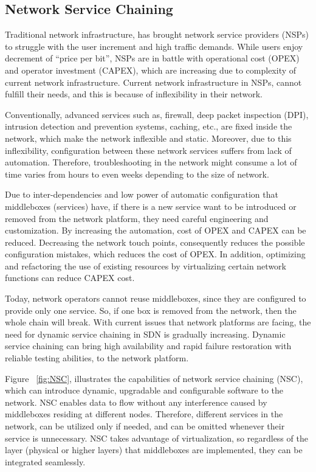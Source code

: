 \subsection{Network Service Chaining}

Traditional network infrastructure, has brought network service providers (NSPs) to struggle with the user increment and high traffic demands. While users enjoy decrement of “price per bit”, NSPs are in battle with operational cost (OPEX) and operator investment (CAPEX), which are increasing due to complexity of current network infrastructure. Current network infrastructure in NSPs, cannot fulfill their needs, and this is because of inflexibility in their network. \cite{Wol13}

Conventionally, advanced services such as, firewall, deep packet inspection (DPI), intrusion detection and prevention systems, caching, etc., are fixed inside the network, which make the network inflexible and static. Moreover, due to this inflexibility, configuration between these network services suffers from lack of automation. Therefore, troubleshooting in the network might consume a lot of time varies from hours to even weeks depending to the size of network. 

Due to inter-dependencies and low power of automatic configuration that middleboxes (services) have, if there is a new service want to be introduced or removed from the network platform, they need careful engineering and customization. By increasing the automation, cost of OPEX and CAPEX can be reduced.  Decreasing the network touch points, consequently reduces the possible configuration mistakes, which reduces the cost of OPEX. In addition, optimizing and refactoring the use of existing resources by virtualizing certain network functions can reduce CAPEX cost. 

Today, network operators cannot reuse middleboxes, since they are configured to provide only one service. So, if one box is removed from the network, then the whole chain will break. With current issues that network platforms are facing,  the need for dynamic service chaining in SDN is gradually increasing. Dynamic service chaining can bring high availability and rapid failure restoration with reliable testing abilities, to the network platform. 

Figure ~\ref{fig:NSC}, illustrates the capabilities of network service chaining (NSC), which can introduce dynamic, upgradable and configurable software to the network. NSC enables data to flow without any interference caused by middleboxes residing at different nodes. Therefore, different services in the network, can be utilized only if needed, and can be omitted whenever their service is unnecessary. NSC takes advantage of virtualization, so regardless of the layer (physical or higher layers) that middleboxes are implemented, they can be integrated seamlessly. 
       
